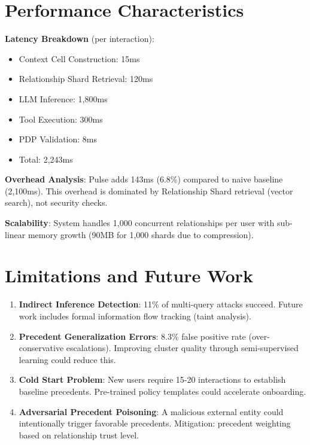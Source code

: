 \section{Performance Characteristics}

\textbf{Latency Breakdown} (per interaction):
\begin{itemize}
    \item Context Cell Construction: 15ms
    \item Relationship Shard Retrieval: 120ms
    \item LLM Inference: 1,800ms
    \item Tool Execution: 300ms
    \item PDP Validation: 8ms
    \item Total: 2,243ms
\end{itemize}

\textbf{Overhead Analysis}: Pulse adds 143ms (6.8\%) compared to naive baseline (2,100ms). This overhead is dominated by Relationship Shard retrieval (vector search), not security checks.

\textbf{Scalability}: System handles 1,000 concurrent relationships per user with sub-linear memory growth (90MB for 1,000 shards due to compression).

\section{Limitations and Future Work}

\begin{enumerate}
    \item \textbf{Indirect Inference Detection}: 11\% of multi-query attacks succeed. Future work includes formal information flow tracking (taint analysis).

    \item \textbf{Precedent Generalization Errors}: 8.3\% false positive rate (over-conservative escalations). Improving cluster quality through semi-supervised learning could reduce this.

    \item \textbf{Cold Start Problem}: New users require 15-20 interactions to establish baseline precedents. Pre-trained policy templates could accelerate onboarding.

    \item \textbf{Adversarial Precedent Poisoning}: A malicious external entity could intentionally trigger favorable precedents. Mitigation: precedent weighting based on relationship trust level.
\end{enumerate}
